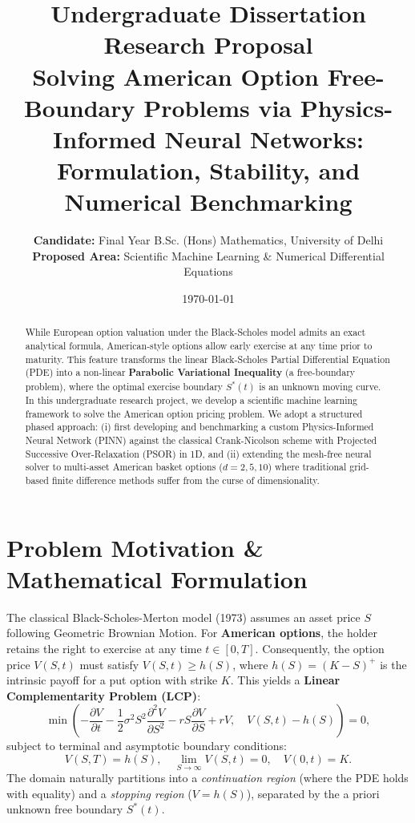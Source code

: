 ﻿\documentclass[10.5pt,a4paper]{article}
\title{\vspace{-2.0em}\textbf{\Large Undergraduate Dissertation Research Proposal}\\[0.25em]
\textbf{\large Solving American Option Free-Boundary Problems via Physics-Informed Neural Networks: Formulation, Stability, and Numerical Benchmarking}}
\author{\textbf{Candidate:} Final Year B.Sc. (Hons) Mathematics, University of Delhi\\
\textbf{Proposed Area:} Scientific Machine Learning \& Numerical Differential Equations}
\date{\vspace{-0.6em}\today}
\begin{document}
\maketitle

\vspace{-1.2em}
\begin{abstract}
\noindent While European option valuation under the Black-Scholes model admits an exact analytical formula, American-style options allow early exercise at any time prior to maturity. This feature transforms the linear Black-Scholes Partial Differential Equation (PDE) into a non-linear \textbf{Parabolic Variational Inequality} (a free-boundary problem), where the optimal exercise boundary $S^*(t)$ is an unknown moving curve. In this undergraduate research project, we develop a scientific machine learning framework to solve the American option pricing problem. We adopt a structured phased approach: (i) first developing and benchmarking a custom Physics-Informed Neural Network (PINN) against the classical Crank-Nicolson scheme with Projected Successive Over-Relaxation (PSOR) in 1D, and (ii) extending the mesh-free neural solver to multi-asset American basket options ($d = 2, 5, 10$) where traditional grid-based finite difference methods suffer from the curse of dimensionality.
\end{abstract}

\vspace{-0.4em}
\section{Problem Motivation \& Mathematical Formulation}
The classical Black-Scholes-Merton model (1973) assumes an asset price $S$ following Geometric Brownian Motion. For \textbf{American options}, the holder retains the right to exercise at any time $t \in [0, T]$. Consequently, the option price $V(S,t)$ must satisfy $V(S,t) \ge h(S)$, where $h(S) = (K - S)^+$ is the intrinsic payoff for a put option with strike $K$. This yields a \textbf{Linear Complementarity Problem (LCP)}:
\begin{equation}
\min \left( -\frac{\partial V}{\partial t} - \frac{1}{2}\sigma^2 S^2 \frac{\partial^2 V}{\partial S^2} - r S \frac{\partial V}{\partial S} + rV, \quad V(S,t) - h(S) \right) = 0,
\end{equation}
subject to terminal and asymptotic boundary conditions:
\begin{equation}
V(S, T) = h(S), \quad \lim_{S \to \infty} V(S, t) = 0, \quad V(0, t) = K.
\end{equation}
The domain naturally partitions into a \textit{continuation region} (where the PDE holds with equality) and a \textit{stopping region} ($V = h(S)$), separated by the a priori unknown free boundary $S^*(t)$.
\end{document}
